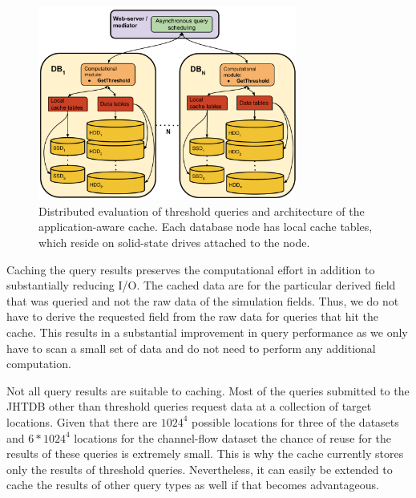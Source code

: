\documentclass{sig-alternate}
\newcommand{\kk}[1]{{\color{blue}{\it KK: #1}}}
\begin{document}
\begin{figure}
\centering
\includegraphics[width=3.35in]{Figures/cache_diagram.pdf}
\caption{Distributed evaluation of threshold queries and architecture of the application-aware cache. 
Each database node has local cache tables, which reside on solid-state drives attached to the node.}
\label{fig:cache_diagram}
\end{figure}

Caching the query results
preserves the computational effort in addition to substantially reducing I/O. The cached data are for the particular derived field that was queried
and not the raw data of the simulation fields.
Thus, we do not have to derive the requested field from the raw data for 
queries that hit the cache. This results in a substantial improvement in query performance as we only have to scan
a small set of data and do not need to perform any additional computation.

Not all query results are suitable to caching. Most of the queries submitted to the JHTDB other than threshold queries request data at a collection of target
locations. Given that there are $1024^4$ possible locations for three of the datasets and $6*1024^4$ locations for the channel-flow dataset the chance of
reuse for the results of these queries is extremely small. This is why the cache currently stores only the results of threshold queries. Nevertheless, it can 
easily be extended to cache the results of other query types as well if that becomes advantageous.

\end{document}
